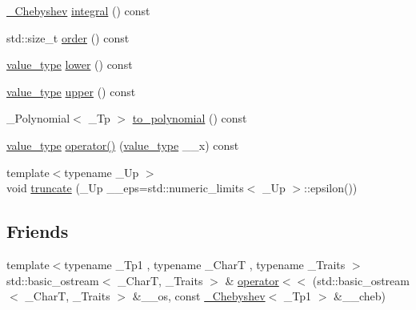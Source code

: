 \begin{DoxyCompactItemize}
\item 
\hyperlink{class____gnu__cxx_1_1__Chebyshev}{\+\_\+\+Chebyshev} \hyperlink{class____gnu__cxx_1_1__Chebyshev_ad6238062674a4ab03fda28c8d1e3774b}{integral} () const
\item 
std\+::size\+\_\+t \hyperlink{class____gnu__cxx_1_1__Chebyshev_a21041ae006b9d2c881868f0fe759ad05}{order} () const
\item 
\hyperlink{class____gnu__cxx_1_1__Chebyshev_a7346ba5843311126dc28cb905687c4a1}{value\+\_\+type} \hyperlink{class____gnu__cxx_1_1__Chebyshev_a1f3e70e588cfc837704461d2319b1e81}{lower} () const
\item 
\hyperlink{class____gnu__cxx_1_1__Chebyshev_a7346ba5843311126dc28cb905687c4a1}{value\+\_\+type} \hyperlink{class____gnu__cxx_1_1__Chebyshev_a7adf49552809774d062c892174491a3f}{upper} () const
\item 
\+\_\+\+Polynomial$<$ \+\_\+\+Tp $>$ \hyperlink{class____gnu__cxx_1_1__Chebyshev_a0039dec54cff971242eb501fd76eec81}{to\+\_\+polynomial} () const
\item 
\hyperlink{class____gnu__cxx_1_1__Chebyshev_a7346ba5843311126dc28cb905687c4a1}{value\+\_\+type} \hyperlink{class____gnu__cxx_1_1__Chebyshev_ab233a66fdf801389715273c560d1beb9}{operator()} (\hyperlink{class____gnu__cxx_1_1__Chebyshev_a7346ba5843311126dc28cb905687c4a1}{value\+\_\+type} \+\_\+\+\_\+x) const
\item 
{\footnotesize template$<$typename \+\_\+\+Up $>$ }\\void \hyperlink{class____gnu__cxx_1_1__Chebyshev_af50304bc19f6383599c4169720ef0a97}{truncate} (\+\_\+\+Up \+\_\+\+\_\+eps=std\+::numeric\+\_\+limits$<$ \+\_\+\+Up $>$\+::epsilon())
\end{DoxyCompactItemize}
\subsection*{Friends}
\begin{DoxyCompactItemize}
\item 
{\footnotesize template$<$typename \+\_\+\+Tp1 , typename \+\_\+\+CharT , typename \+\_\+\+Traits $>$ }\\std\+::basic\+\_\+ostream$<$ \+\_\+\+CharT, \+\_\+\+Traits $>$ \& \hyperlink{class____gnu__cxx_1_1__Chebyshev_aa91d6f92fc41ecb09a2989f663ba7d9e}{operator$<$$<$} (std\+::basic\+\_\+ostream$<$ \+\_\+\+CharT, \+\_\+\+Traits $>$ \&\+\_\+\+\_\+os, const \hyperlink{class____gnu__cxx_1_1__Chebyshev}{\+\_\+\+Chebyshev}$<$ \+\_\+\+Tp1 $>$ \&\+\_\+\+\_\+cheb)
\end{DoxyCompactItemize}


